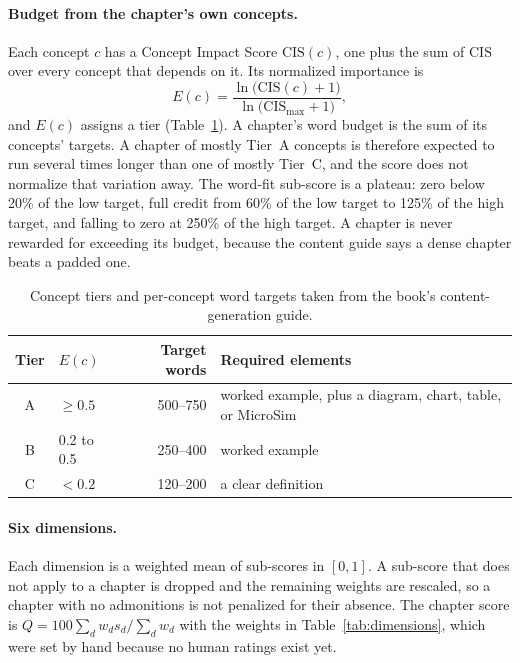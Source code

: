 \documentclass[11pt]{article}
\begin{document}
\paragraph{Budget from the chapter's own concepts.}
Each concept $c$ has a Concept Impact Score $\mathrm{CIS}(c)$, one plus the sum of $\mathrm{CIS}$ over every concept that depends on it. Its normalized importance is
\begin{equation}
E(c) = \frac{\ln\bigl(\mathrm{CIS}(c)+1\bigr)}{\ln\bigl(\mathrm{CIS}_{\max}+1\bigr)},
\end{equation}
and $E(c)$ assigns a tier (Table~\ref{tab:tiers}). A chapter's word budget is the sum of its concepts' targets. A chapter of mostly Tier~A concepts is therefore expected to run several times longer than one of mostly Tier~C, and the score does not normalize that variation away. The word-fit sub-score is a plateau: zero below 20\% of the low target, full credit from 60\% of the low target to 125\% of the high target, and falling to zero at 250\% of the high target. A chapter is never rewarded for exceeding its budget, because the content guide says a dense chapter beats a padded one.

\begin{table}[htbp]
\centering
\small
\begin{tabular}{@{}clrl@{}}
\toprule
\textbf{Tier} & \textbf{$E(c)$} & \textbf{Target words} & \textbf{Required elements} \\
\midrule
A & $\ge 0.5$ & 500--750 & worked example, plus a diagram, chart, table, or MicroSim \\
B & 0.2 to 0.5 & 250--400 & worked example \\
C & $<0.2$ & 120--200 & a clear definition \\
\bottomrule
\end{tabular}
\caption{Concept tiers and per-concept word targets taken from the book's content-generation guide.}
\label{tab:tiers}
\end{table}

\paragraph{Six dimensions.}
Each dimension is a weighted mean of sub-scores in $[0,1]$. A sub-score that does not apply to a chapter is dropped and the remaining weights are rescaled, so a chapter with no admonitions is not penalized for their absence. The chapter score is $Q = 100\sum_d w_d s_d \big/ \sum_d w_d$ with the weights in Table~\ref{tab:dimensions}, which were set by hand because no human ratings exist yet.
\end{document}

